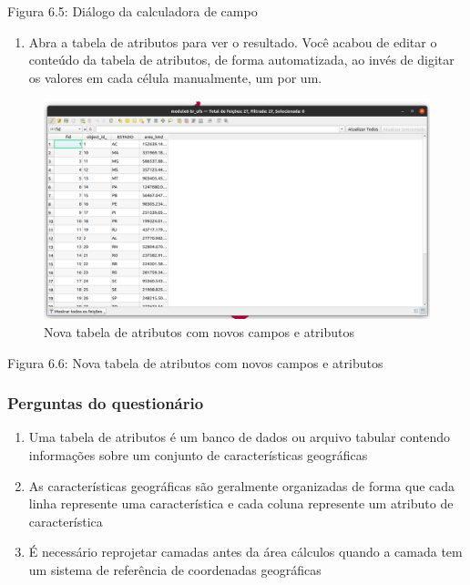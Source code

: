 \documentclass[
  portuguese,
]{krantz}
\providecommand{\tightlist}{%
  \setlength{\itemsep}{0pt}\setlength{\parskip}{0pt}}
\begin{document}
Figura 6.5: Diálogo da calculadora de campo

\begin{enumerate}
\def\labelenumi{\arabic{enumi}.}
\setcounter{enumi}{5}
\tightlist
\item
  Abra a tabela de atributos para ver o resultado. Você acabou de editar o conteúdo da tabela de atributos, de forma automatizada, ao invés de digitar os valores em cada célula manualmente, um por um.
\end{enumerate}

\begin{figure}
\centering
\includegraphics{media/modulo6/area.png}
\caption{Nova tabela de atributos com novos campos e atributos}
\end{figure}

Figura 6.6: Nova tabela de atributos com novos campos e atributos

\hypertarget{perguntas-do-questionuxe1rio-11}{%
\subsubsection{\texorpdfstring{\textbf{Perguntas do questionário}}{Perguntas do questionário}}\label{perguntas-do-questionuxe1rio-11}}

\begin{enumerate}
\def\labelenumi{\arabic{enumi}.}
\item
  Uma tabela de atributos é um banco de dados ou arquivo tabular contendo informações sobre um conjunto de características geográficas
\item
  As características geográficas são geralmente organizadas de forma que cada linha represente uma característica e cada coluna represente um atributo de característica
\item
  É necessário reprojetar camadas antes da área cálculos quando a camada tem um sistema de referência de coordenadas geográficas
\end{enumerate}
\end{document}

